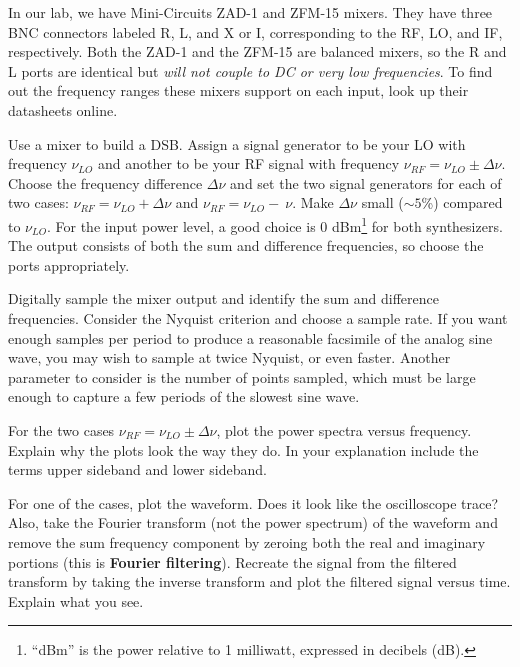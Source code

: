 \documentclass[11pt,preprint]{aastex}
\begin{document}
In our lab, we have Mini-Circuits ZAD-1 and ZFM-15 mixers. 
They have three BNC connectors
labeled R, L, and X or I, corresponding to
the RF, LO, and IF, respectively.
Both the ZAD-1 and the ZFM-15 are
balanced mixers, so the R and L ports are identical but
{\it will not couple to DC or very low frequencies}.  To find out
the frequency ranges these mixers support on each input, 
look up their datasheets online. 


Use a mixer to build a DSB.
Assign a signal generator to
be your LO with frequency $\nu_{LO}$ and
another to be your RF signal with frequency $\nu_{RF} = \nu_{LO} \pm
\Delta \nu$.  Choose the frequency difference $\Delta \nu$ and
set the two signal generators 
for each of two cases:
$\nu_{RF} = \nu_{LO} + \Delta \nu$ and $\nu_{RF} = \nu_{LO} - \
\nu$.  Make $\Delta \nu$ small ($\sim5$\%) compared to $\nu_{LO}$.
For the input power level, a good choice is 0
dBm\footnote{``dBm'' is the power relative to 1 milliwatt, expressed in decibels (dB).}
for both synthesizers. The output consists of both the
sum and difference frequencies, so choose the ports appropriately.

Digitally sample the mixer output and identify the
sum and difference frequencies.
Consider
the Nyquist criterion and choose a sample rate. If you want enough samples per period to
produce a reasonable facsimile of the analog sine wave,
you may wish to sample at twice
Nyquist, or even faster.  Another parameter to consider is the number of points
sampled, which must be large enough to capture a few
periods of the slowest sine wave.

For the two cases $\nu_{RF} = \nu_{LO} \pm \Delta \nu$, plot the power
spectra versus frequency. Explain why the plots look the way they do. In
your explanation include the terms upper sideband and lower
sideband.

For one of the cases, plot the waveform.  Does it look like the
oscilloscope trace? Also, take the Fourier transform (not the power
spectrum) of the waveform and remove the sum frequency component by
zeroing both the real and imaginary portions (this is {\bf Fourier
filtering}).  Recreate the signal from the filtered transform by taking
the inverse transform and plot the filtered signal versus time.  Explain
what you see.
\end{document}
